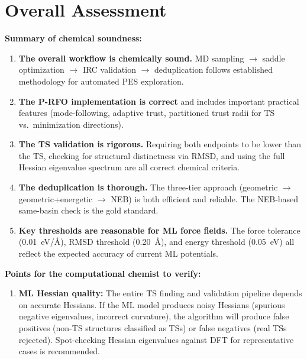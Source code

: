 \documentclass[11pt,a4paper]{article}
\begin{document}
\section{Overall Assessment}
\label{sec:assessment}

\begin{evaluation}
\textbf{Summary of chemical soundness:}

\begin{enumerate}
    \item \textbf{The overall workflow is chemically sound.} MD sampling $\to$ saddle optimization $\to$ IRC validation $\to$ deduplication follows established methodology for automated PES exploration.

    \item \textbf{The P-RFO implementation is correct} and includes important practical features (mode-following, adaptive trust, partitioned trust radii for TS vs.\ minimization directions).

    \item \textbf{The TS validation is rigorous.} Requiring both endpoints to be lower than the TS, checking for structural distinctness via RMSD, and using the full Hessian eigenvalue spectrum are all correct chemical criteria.

    \item \textbf{The deduplication is thorough.} The three-tier approach (geometric $\to$ geometric+energetic $\to$ NEB) is both efficient and reliable. The NEB-based same-basin check is the gold standard.

    \item \textbf{Key thresholds are reasonable for ML force fields.} The force tolerance (\SI{0.01}{eV/\angstrom}), RMSD threshold (\SI{0.20}{\angstrom}), and energy threshold (\SI{0.05}{eV}) all reflect the expected accuracy of current ML potentials.
\end{enumerate}

\textbf{Points for the computational chemist to verify:}

\begin{enumerate}
    \item \textbf{ML Hessian quality:} The entire TS finding and validation pipeline depends on accurate Hessians. If the ML model produces noisy Hessians (spurious negative eigenvalues, incorrect curvature), the algorithm will produce false positives (non-TS structures classified as TSs) or false negatives (real TSs rejected). Spot-checking Hessian eigenvalues against DFT for representative cases is recommended.


\end{enumerate}
\end{evaluation}
\end{document}
